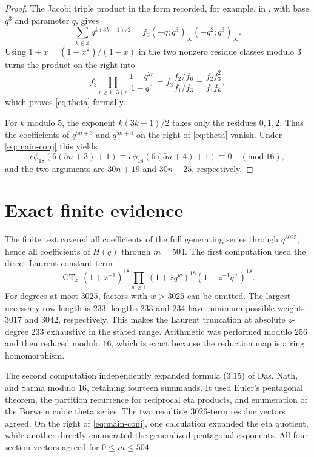 \documentclass[11pt]{article}
\newcommand{\cphi}{c\phi}
\newcommand{\CT}{\operatorname{CT}}
\begin{document}
\begin{proof}
The Jacobi triple product in the form recorded, for example, in
\cite[Theorem 2.8]{Andrews1998Partitions}, with base \(q^3\) and parameter
\(q\), gives
\[
 \sum_{k\in\mathbb Z}q^{k(3k-1)/2}
 =f_3(-q;q^3)_\infty(-q^2;q^3)_\infty.
\]
Using $1+x=(1-x^2)/(1-x)$ in the two nonzero residue classes modulo $3$
turns the product on the right into
\[
 f_3\prod_{r\geq1,\,3\nmid r}
 \frac{1-q^{2r}}{1-q^r}
 =f_3\frac{f_2/f_6}{f_1/f_3}
 =\frac{f_2f_3^2}{f_1f_6},
\]
which proves \eqref{eq:theta} formally.

For $k$ modulo $5$, the exponent $k(3k-1)/2$ takes only the residues
$0,1,2$.  Thus the coefficients of $q^{5n+3}$ and $q^{5n+4}$ on the
right of \eqref{eq:theta} vanish.  Under \eqref{eq:main-conj} this yields
\[
 \cphi_{18}(6(5n+3)+1)\equiv
 \cphi_{18}(6(5n+4)+1)\equiv0\quad(\mathrm{mod}\ 16),
\]
and the two arguments are $30n+19$ and $30n+25$, respectively.
\end{proof}

\section{Exact finite evidence}

The finite test covered all coefficients of the full generating series
through $q^{3025}$, hence all coefficients of $H(q)$ through $m=504$.
The first computation used the direct Laurent constant term
\begin{equation}\label{eq:ct}
 \CT_z\,(1+z^{-1})^{18}
 \prod_{w\geq1}(1+zq^w)^{18}(1+z^{-1}q^w)^{18}.
\end{equation}
For degrees at most $3025$, factors with $w>3025$ can be omitted.  The
largest necessary row length is $233$: lengths $233$ and $234$ have
minimum possible weights $3017$ and $3042$, respectively.  This makes the
Laurent truncation at absolute $z$-degree $233$ exhaustive in the stated
range.  Arithmetic was performed modulo $256$ and then reduced modulo
$16$, which is exact because the reduction map is a ring homomorphism.

The second computation independently expanded formula (3.15) of
Das, Nath, and Sarma \cite{DasNathSarma2026} modulo $16$,
retaining fourteen summands. It used Euler's pentagonal theorem,
the partition recurrence for reciprocal eta products, and enumeration of the
Borwein cubic theta series.  The two resulting $3026$-term residue vectors
agreed.  On the right of \eqref{eq:main-conj}, one calculation expanded the
eta quotient, while another directly enumerated the generalized pentagonal
exponents.  All four section vectors agreed for $0\leq m\leq504$.
\end{document}
